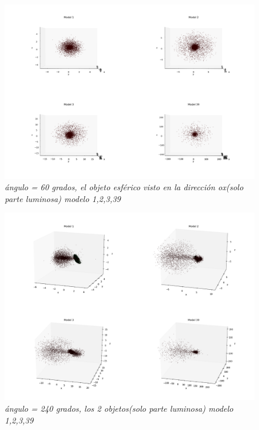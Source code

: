 \documentclass[12pt]{article} %
\renewcommand{\=}[1]{\stackrel{#1}{=}} %
\theoremstyle{definition}
\theoremstyle{remark}
\begin{document}
\begin{figure}[!ht]
 \centering
 \includegraphics[scale=0.2]{sep5-60deg-eox.png}
 \caption{\emph{ ángulo = 60 grados, el objeto esférico visto en la dirección ox(solo parte luminosa) modelo 1,2,3,39 }}
\end{figure}

\begin{figure}[!ht]
 \centering
 \includegraphics[scale=0.2]{240deg-m.png}
 \caption{\emph{ ángulo = 240 grados, los 2 objetos(solo parte luminosa) modelo 1,2,3,39 }}
\end{figure}
\end{document}
